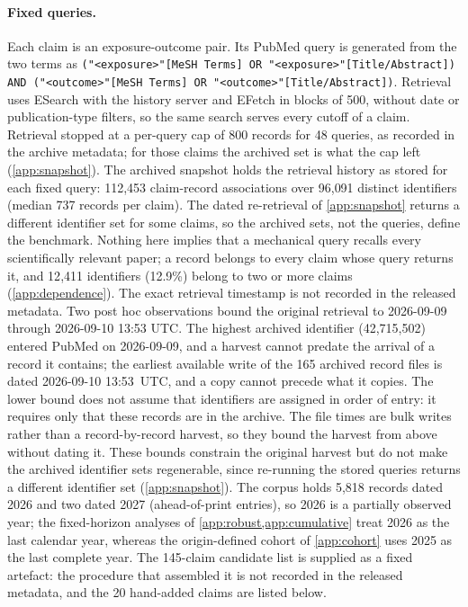 \documentclass[11pt]{article}
\begin{document}
\paragraph{Fixed queries.} Each claim is an exposure-outcome pair. Its PubMed query is generated from
the two terms as \texttt{("<exposure>"[MeSH Terms] OR "<exposure>"[Title/Abstract]) AND
("<outcome>"[MeSH Terms] OR "<outcome>"[Title/Abstract])}. Retrieval uses ESearch with the history
server and EFetch in blocks of 500, without date or publication-type filters, so
the same search serves every cutoff of a claim. Retrieval stopped at a per-query cap of 800 records
for 48 queries, as recorded in the archive metadata; for those claims the archived set is what the
cap left (\cref{app:snapshot}). The archived snapshot holds the retrieval history as stored
for each fixed query: 112{,}453 claim-record associations over 96{,}091 distinct identifiers (median
737 records per claim). The dated re-retrieval of \cref{app:snapshot} returns a different identifier set for some claims,
so the archived sets, not the queries, define the benchmark. Nothing here implies that a mechanical query recalls every
scientifically relevant paper; a record belongs to every claim whose query returns it, and 12{,}411
identifiers (12.9\%) belong to two or more claims (\cref{app:dependence}). The exact retrieval timestamp is not recorded in the released metadata. Two post hoc
observations bound the original retrieval to 2026-09-09 through 2026-09-10 13:53 UTC. The highest archived
identifier (42{,}715{,}502) entered PubMed on 2026-09-09, and a harvest cannot predate the
arrival of a record it contains; the earliest available write of the 165 archived
record files is dated 2026-09-10 13:53~UTC, and a copy cannot precede what it copies. The lower
bound does not assume that identifiers are assigned in order of entry: it requires only that
these records are in the archive. The file times are bulk writes rather than a record-by-record
harvest, so they bound the harvest from above without dating it. These bounds constrain the
original harvest but do not make the archived identifier sets regenerable, since re-running the
stored queries returns a different identifier set (\cref{app:snapshot}). The corpus holds 5{,}818 records dated 2026 and two dated 2027
(ahead-of-print entries), so 2026 is a partially observed year; the fixed-horizon analyses of
\cref{app:robust,app:cumulative} treat 2026 as the last calendar year, whereas the origin-defined cohort of \cref{app:cohort} uses 2025 as the last complete year. The 145-claim candidate list is supplied
as a fixed artefact: the procedure that assembled it is not recorded in the released metadata, and
the 20 hand-added claims are listed below.
\end{document}
